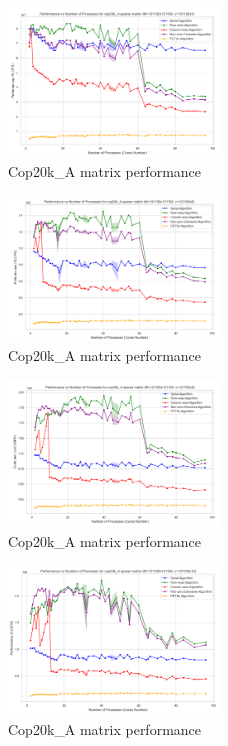 \documentclass[12pt,oneside]{book} %
\begin{document}
\begin{figure}[H]
    \centering
    \includegraphics[width=0.5\textwidth]{../results/fat_vector_dim/cop20k_A_k3_performance.png}
    \caption{Cop20k\_A matrix performance}\label{fig:cop20k-a-k3-performance}
\end{figure}

\begin{figure}[H]
    \centering
    \includegraphics[width=0.5\textwidth]{../results/fat_vector_dim/cop20k_A_k6_performance.png}
    \caption{Cop20k\_A matrix performance}\label{fig:cop20k-a-k6-performance}
\end{figure}

\begin{figure}[H]
    \centering
    \includegraphics[width=0.5\textwidth]{../results/fat_vector_dim/cop20k_A_k9_performance.png}
    \caption{Cop20k\_A matrix performance}\label{fig:cop20k-a-k9-performance}
\end{figure}

\begin{figure}[H]
    \centering
    \includegraphics[width=0.5\textwidth]{../results/fat_vector_dim/cop20k_A_k12_performance.png}
    \caption{Cop20k\_A matrix performance}\label{fig:cop20k-a-k12-performance}
\end{figure}
\end{document}
